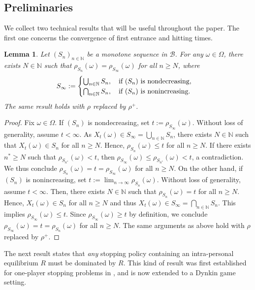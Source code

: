 \documentclass[11pt,reqno]{article}
\numberwithin{equation}{section}
\newtheorem{lemma}{Lemma}[section]
\newcommand{\N}{\mathbb{N}}
\newcommand{\B}{\mathcal{B}}
\begin{document}
\subsection{Preliminaries}
We collect two technical results that will be useful throughout the paper. The first one concerns the convergence of first entrance and hitting times.

\begin{lemma}\label{l1}
Let $(S_n)_{n\in\N}$ be a monotone sequence in $\B$. For any $\omega\in\Omega$, there exists $N\in\N$ such that $\rho_{S_n}(\omega)=\rho_{S_\infty}(\omega)$ for all $n\ge N$, where 
\begin{equation}
S_\infty := 
\begin{cases}
\bigcup_{n\in\N} S_n,\quad \hbox{if}\ (S_n)\ \hbox{is nondecreasing},\\
\bigcap_{n\in\N} S_n,\quad \hbox{if}\ (S_n)\ \hbox{is nonincreasing}. 
\end{cases}
\end{equation}
The same result holds with $\rho$ replaced by $\rho^+$. 
\end{lemma}

\begin{proof}
Fix $\omega\in\Omega$. If $(S_n)$ is nondecreasing, set $t:=\rho_{S_\infty}(\omega)$. Without loss of generality, assume  $t<\infty$. As $X_t(\omega)\in S_\infty=\bigcup_{n\in\N} S_n$, there exists $N\in\N$ such that $X_t(\omega)\in S_n$ for all $n\ge N$. Hence, $\rho_{S_n}(\omega)\leq t$ for all $n\ge N$. If there exists $n^*\ge N$ such that $\rho_{S_{n^*}}(\omega)< t$, then $\rho_{S_\infty}(\omega)\le \rho_{S_{n^*}}(\omega)<t$, a contradiction. We thus conclude $\rho_{S_n}(\omega)= t = \rho_{S_\infty}(\omega)$ for all $n\ge N$. 
On the other hand, if $(S_n)$ is nonincreasing, set $t:=\lim_{n\to\infty}\rho_{S_n}(\omega)$. Without loss of generality, assume $t<\infty$. Then, there exists $N\in\N$ such that $\rho_{S_n} (\omega)=t$ for all $n\ge N$. Hence, $X_{t}(\omega)\in S_n$ for all $n\ge N$ and thus $X_t(\omega)\in S_\infty=\bigcap_{n\in\N} S_n$. This implies $\rho_{S_\infty}(\omega)\le t$. Since $\rho_{S_\infty}(\omega)\ge t$ by definition, we conclude $\rho_{S_\infty}(\omega)= t=\rho_{S_n}(\omega)$ for all $n\ge N$. 
 The same arguments as above hold with $\rho$ replaced by $\rho^+$. 
\end{proof}

The next result states that {\it any} stopping policy containing an intra-personal equilibrium $R$ must be dominated by $R$. This kind of result was first established for one-player stopping problems in \cite[Lemma 3.1]{HZ20}, and is now extended to a Dynkin game setting.  
\end{document}
